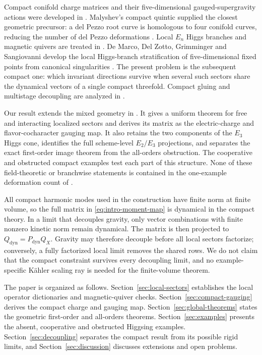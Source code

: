 Compact conifold charge matrices and their five-dimensional
gauged-supergravity actions were developed in \cite{Mohaupt:2004de}.
Malyshev's compact quintic supplied the closest geometric precursor: a del
Pezzo root curve is homologous to four conifold curves, reducing the number of
del Pezzo deformations \cite{Malyshev:2007zz}. Local $E_n$ Higgs branches and
magnetic quivers are treated in
\cite{Cremonesi:2015lsa,Ferlito:2016,Cabrera:2018,Bourget:2020bxh,Closset:2020afy}.
De Marco, Del Zotto, Grimminger and Sangiovanni develop the local Higgs-branch
stratification of five-dimensional fixed points from canonical singularities
\cite{DeMarco:2026higgs}. The present problem is the subsequent compact one:
which invariant directions survive when several such sectors share the
dynamical vectors of a single compact threefold. Compact gluing and multistage
decoupling are analyzed in
\cite{Apruzzi:2019vpe,Cvetic:2023plv}.

Our result extends the mixed geometry in
\cite{Malyshev:2007zz}. It gives a uniform theorem for free and interacting
localized sectors and derives its matrix as the electric-charge and
flavor-cocharacter gauging map. It also retains the two components of the
$E_3$ Higgs cone, identifies the full scheme-level $E_2/E_3$ projections, and
separates the exact first-order image theorem from the all-orders obstruction.
The cooperative and obstructed compact examples test each part of this
structure. None of these field-theoretic or branchwise statements is contained
in the one-example deformation count of \cite{Malyshev:2007zz}.

All compact harmonic modes used in the construction have finite norm at
finite volume, so the full matrix in \eqref{eq:intro-moment-map} is dynamical
in the compact theory. In a limit that decouples gravity, only vector
combinations with finite nonzero kinetic norm remain dynamical. The matrix is
then projected to $Q_{\mathrm{dyn}}=P_{\mathrm{dyn}}Q_X$. Gravity may therefore
decouple before all local sectors factorize; conversely, a fully factorized
local limit removes the shared rows. We do not claim that the compact
constraint survives every decoupling limit, and no example-specific K\"ahler
scaling ray is needed for the finite-volume theorem.

The paper is organized as follows. Section~\ref{sec:local-sectors} establishes
the local operator dictionaries and magnetic-quiver checks.
Section~\ref{sec:compact-gauging} derives the compact charge and gauging map.
Section~\ref{sec:global-theorems} states the geometric first-order and
all-orders theorems. Section~\ref{sec:examples} presents the absent,
cooperative and obstructed Higgsing examples. Section~\ref{sec:decoupling}
separates the compact result from its possible rigid limits, and
Section~\ref{sec:discussion} discusses extensions and open problems.
